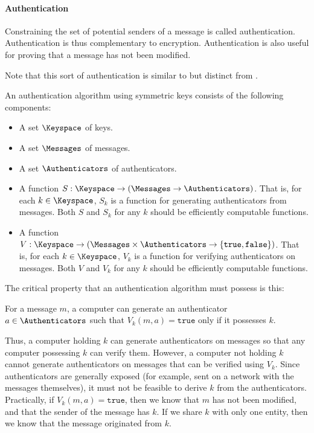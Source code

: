 \paragraph{Authentication}\label{par:Authentication}
Constraining the set of potential senders of a message is called authentication.
Authentication is thus complementary to encryption.
Authentication is also useful for proving that a message has not been modified.

Note that this sort of authentication is similar to but distinct from .

An authentication algorithm using symmetric keys consists of the following components:
\begin{itemize}[noitemsep]
\item A set $\Keyspace$ of keys.
\item A set $\Messages$ of messages.
\item A set $\Authenticators$ of authenticators.
\item A function $S : \Keyspace \rightarrow (\Messages \rightarrow \Authenticators)$.
  That is, for each $k \in \Keyspace$, $S_{k}$ is a function for generating authenticators from messages.
  Both $S$ and $S_{k}$ for any $k$ should be efficiently computable functions.
\item A function $V : \Keyspace \rightarrow (\Messages \times \Authenticators \rightarrow \lbrace \mathtt{true}, \mathtt{false} \rbrace)$.
  That is, for each $k \in \Keyspace$, $V_{k}$ is a function for verifying authenticators on messages.
  Both $V$ and $V_{k}$ for any $k$ should be efficiently computable functions.
\end{itemize}

The critical property that an authentication algorithm must possess is this:
\begin{blackbox}
  For a message $m$, a computer can generate an authenticator $a \in \Authenticators$ such that $V_{k}(m, a) = \mathtt{true}$ only if it possesses $k$.
\end{blackbox}

Thus, a computer holding $k$ can generate authenticators on messages so that any computer possessing $k$ can verify them.
However, a computer not holding $k$ cannot generate authenticators on messages that can be verified using $V_{k}$.
Since authenticators are generally exposed (for example, sent on a network with the messages themselves), it must not be feasible to derive $k$ from the authenticators.
Practically, if $V_{k}(m, a) = \mathtt{true}$, then we know that $m$ has not been modified, and that the sender of the message has $k$.
If we share $k$ with only one entity, then we know that the message originated from $k$.



